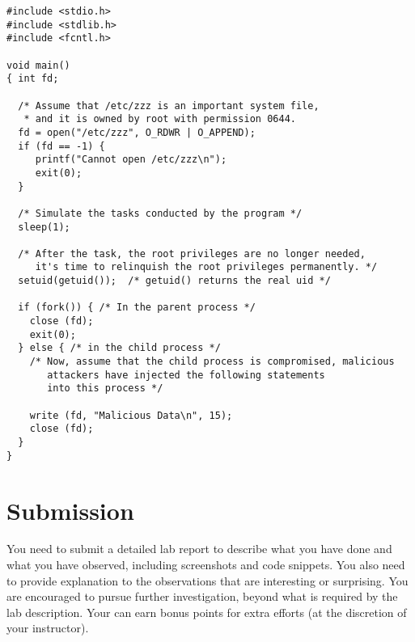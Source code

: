 \begin{Verbatim}[frame=single]
#include <stdio.h>
#include <stdlib.h>
#include <fcntl.h>

void main()
{ int fd;

  /* Assume that /etc/zzz is an important system file,
   * and it is owned by root with permission 0644.
  fd = open("/etc/zzz", O_RDWR | O_APPEND);
  if (fd == -1) {
     printf("Cannot open /etc/zzz\n");
     exit(0);
  }

  /* Simulate the tasks conducted by the program */
  sleep(1);

  /* After the task, the root privileges are no longer needed,
     it's time to relinquish the root privileges permanently. */
  setuid(getuid());  /* getuid() returns the real uid */

  if (fork()) { /* In the parent process */
    close (fd);
    exit(0);
  } else { /* in the child process */
    /* Now, assume that the child process is compromised, malicious
       attackers have injected the following statements
       into this process */

    write (fd, "Malicious Data\n", 15);
    close (fd);
  }
}
\end{Verbatim}



\section{Submission}


You need to submit a detailed lab report to describe what you have done and
what you have observed, including screenshots and code snippets.
You also need to provide explanation to the
observations that are interesting or surprising. You are encouraged to
pursue further investigation, beyond what is required by the lab
description. Your can earn bonus points for extra efforts (at the
discretion of your instructor).



